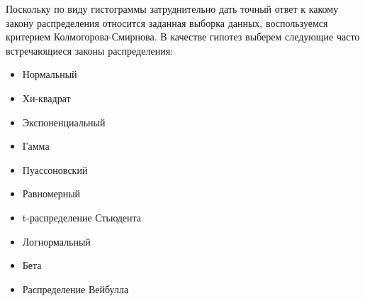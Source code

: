 \documentclass[a4paper, 14pt]{extarticle}
\begin{document}
Поскольку по виду гистограммы затруднительно дать точный ответ к какому
закону распределения относится заданная выборка данных, воспользуемся 
критерием Колмогорова-Смирнова. В качестве гипотез выберем следующие часто 
встречающиеся законы распределения:

\begin{center}
    \begin{multicols}{3}
        \begin{itemize}[itemsep=10pt]
            \item Нормальный
            \item Хи-квадрат
            \item Экспоненциальный
            \item Гамма
            \item Пуассоновский
            \item Равномерный
            \item t-распределение Стьюдента
            \item Логнормальный
            \item Бета
            \item Распределение Вейбулла
        \end{itemize}
    \end{multicols}
\end{center}
\end{document}
